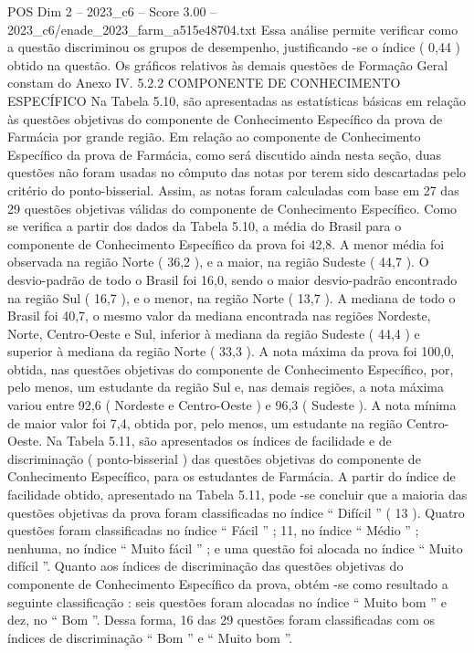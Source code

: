 \begin{textsample}{POS Dim 2 – 2023\_c6 – Score 3.00 – 2023\_c6/enade\_2023\_farm\_a515e48704.txt}
Essa análise permite verificar como a questão discriminou os grupos de desempenho, justificando -se o índice ( 0,44 ) obtido na questão.
Os gráficos relativos às demais questões de Formação Geral constam do Anexo IV. 5.2.2 COMPONENTE DE CONHECIMENTO ESPECÍFICO Na Tabela 5.10, são apresentadas as estatísticas básicas em relação às questões objetivas do componente de Conhecimento Específico da prova de Farmácia por grande região.
Em relação ao componente de Conhecimento Específico da prova de Farmácia, como será discutido ainda nesta seção, duas questões não foram usadas no cômputo das notas por terem sido descartadas pelo critério do ponto-bisserial.
Assim, as notas foram calculadas com base em 27 das 29 questões objetivas válidas do componente de Conhecimento Específico.
Como se verifica a partir dos dados da Tabela 5.10, a média do Brasil para o componente de Conhecimento Específico da prova foi 42,8.
A menor média foi observada na região Norte ( 36,2 ), e a maior, na região Sudeste ( 44,7 ).
O desvio-padrão de todo o Brasil foi 16,0, sendo o maior desvio-padrão encontrado na região Sul ( 16,7 ), e o menor, na região Norte ( 13,7 ).
A mediana de todo o Brasil foi 40,7, o mesmo valor da mediana encontrada nas regiões Nordeste, Norte, Centro-Oeste e Sul, inferior à mediana da região Sudeste ( 44,4 ) e superior à mediana da região Norte ( 33,3 ).
A nota máxima da prova foi 100,0, obtida, nas questões objetivas do componente de Conhecimento Específico, por, pelo menos, um estudante da região Sul e, nas demais regiões, a nota máxima variou entre 92,6 ( Nordeste e Centro-Oeste ) e 96,3 ( Sudeste ).
A nota mínima de maior valor foi 7,4, obtida por, pelo menos, um estudante na região Centro-Oeste.
Na Tabela 5.11, são apresentados os índices de facilidade e de discriminação ( ponto-bisserial ) das questões objetivas do componente de Conhecimento Específico, para os estudantes de Farmácia.
A partir do índice de facilidade obtido, apresentado na Tabela 5.11, pode -se concluir que a maioria das questões objetivas da prova foram classificadas no índice “ Difícil ” ( 13 ).
Quatro questões foram classificadas no índice “ Fácil ” ; 11, no índice “ Médio ” ; nenhuma, no índice “ Muito fácil ” ; e uma questão foi alocada no índice “ Muito difícil ”.
Quanto aos índices de discriminação das questões objetivas do componente de Conhecimento Específico da prova, obtém -se como resultado a seguinte classificação : seis questões foram alocadas no índice “ Muito bom ” e dez, no “ Bom ”.
Dessa forma, 16 das 29 questões foram classificadas com os índices de discriminação “ Bom ” e “ Muito bom ”.

\end{textsample}
